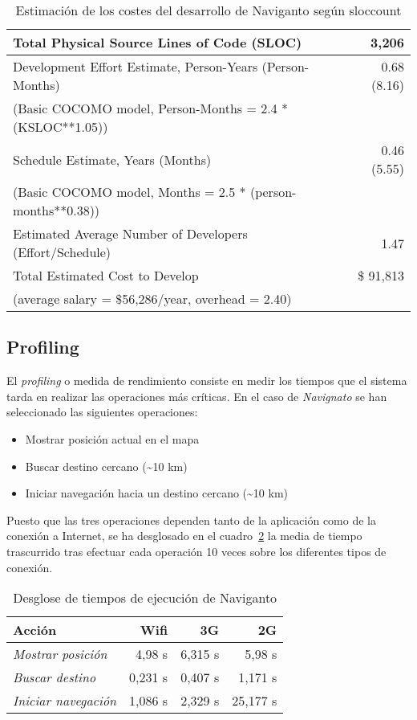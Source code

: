 \begin{table}[h]
  \centering
  \begin{tabular}{|l|r|}
    \hline
    Total Physical Source Lines of Code (SLOC) & 3,206 \\
    \hline
    Development Effort Estimate, Person-Years (Person-Months) & 0.68 (8.16) \\
    (Basic COCOMO model, Person-Months = 2.4 * (KSLOC**1.05)) & \\
    \hline
    Schedule Estimate, Years (Months) & 0.46 (5.55) \\
    (Basic COCOMO model, Months = 2.5 * (person-months**0.38)) & \\
    \hline
    Estimated Average Number of Developers (Effort/Schedule) & 1.47 \\
    \hline
    Total Estimated Cost to Develop & \$ 91,813 \\
    (average salary = \$56,286/year, overhead = 2.40) & \\
    \hline
  \end{tabular}
  \caption{Estimación de los costes del desarrollo de Naviganto según sloccount}
  \label{cuadro:cocomo}
\end{table}

\subsection{Profiling}

El \emph{profiling} o medida de rendimiento consiste en medir los tiempos que el sistema tarda en
realizar las operaciones más críticas. En el caso de \emph{Navignato} se han seleccionado las
siguientes operaciones:

\begin{itemize}
  \item Mostrar posición actual en el mapa
  \item Buscar destino cercano (\textasciitilde{}10 km)
  \item Iniciar navegación hacia un destino cercano (\textasciitilde{}10 km)
\end{itemize}

Puesto que las tres operaciones dependen tanto de la aplicación como de la conexión a Internet, se
ha desglosado en el cuadro~\ref{cuadro:conexion} la media de tiempo trascurrido tras efectuar cada
operación 10 veces sobre los diferentes tipos de conexión.

\begin{table}[h]
  \centering
  \begin{tabular}{|l|r|r|r|}
    \hline
    \textbf{Acción} & \textbf{Wifi} & \textbf{3G} & \textbf{2G} \\
    \hline
    \emph{Mostrar posición}   &  4,98 s & 6,315 s &   5,98 s \\
    \hline
    \emph{Buscar destino}     & 0,231 s & 0,407 s &  1,171 s \\
    \hline
    \emph{Iniciar navegación} & 1,086 s & 2,329 s & 25,177 s \\
    \hline
  \end{tabular}
  \caption{Desglose de tiempos de ejecución de Naviganto}
  \label{cuadro:conexion}
\end{table}

